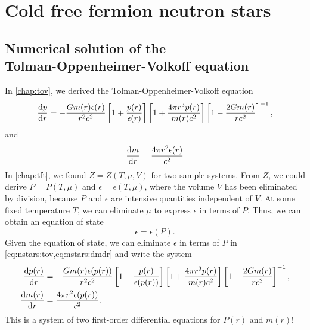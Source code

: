 \chapter{Cold free fermion neutron stars}


\section{Numerical solution of the \texorpdfstring{\\}{}Tolman-Oppenheimer-Volkoff equation}
\label{sec:nstars:numtov}

In \cref{chap:tov}, we derived the Tolman-Oppenheimer-Volkoff equation
\begin{equation}
	\odv{p}{r} = -\frac{G m(r) \epsilon(r)}{r^2 c^2} \left[ 1 + \frac{p(r)}{\epsilon(r)} \right] \left[ 1 + \frac{4 \pi r^3 p(r)}{m(r) c^2} \right] \left[ 1 - \frac{2 G m(r)}{r c^2} \right]^{-1} ,
\label{eq:nstars:tov}
\end{equation}
and
\begin{equation}
	\odv{m}{r} = \frac{4 \pi r^2 \epsilon(r)}{c^2}
\label{eq:nstars:dmdr}
\end{equation}
In \cref{chap:tft}, we found $Z = Z(T, \mu, V)$ for two sample systems.
From $Z$, we could derive $P = P(T, \mu)$ and $\epsilon = \epsilon(T, \mu)$, where the volume $V$ has been eliminated by division, because $P$ and $\epsilon$ are intensive quantities independent of $V$.
At some fixed temperature $T$, we can eliminate $\mu$ to express $\epsilon$ in terms of $P$.
Thus, we can obtain an equation of state
\begin{equation}
	\epsilon = \epsilon(P).
\label{eq:nstars:eos}
\end{equation}
Given the equation of state, we can eliminate $\epsilon$ in terms of $P$ in \cref{eq:nstars:tov,eq:nstars:dmdr} and write the system
\begin{equation}
\begin{split}
	\odv{p(r)}{r} &= -\frac{G m(r) \epsilon(p(r))}{r^2 c^2} \left[ 1 + \frac{p(r)}{\epsilon(p(r))} \right] \left[ 1 + \frac{4 \pi r^3 p(r)}{m(r) c^2} \right] \left[ 1 - \frac{2 G m(r)}{r c^2} \right]^{-1}, \\
	\odv{m(r)}{r} &= \frac{4 \pi r^2 \epsilon(p(r))}{c^2}. \\
\end{split}
\end{equation}
This is a system of two first-order differential equations for $P(r)$ and $m(r)$!
